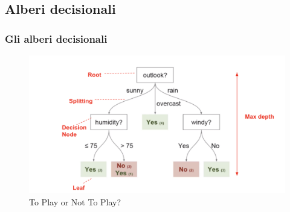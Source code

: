 \subsection[Alberi decisionali]{Alberi decisionali}


\begin{frame}
	
	\frametitle{Gli alberi decisionali}
	
	\begin{figure}[!htbp]
		\centering
		\includegraphics[width=0.95\linewidth]{images/supervised/decision_trees/decision_trees.png}
		\caption{To Play or Not To Play?}
	\end{figure}
	
\end{frame}


